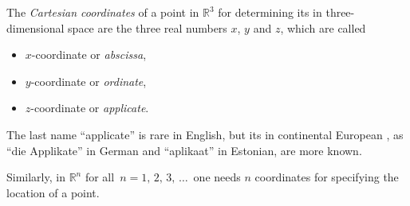 \documentclass[12pt]{article}
\begin{document}
The {\em Cartesian coordinates} of a point in $\mathbb{R}^3$ for determining its  in three-dimensional space are the three real numbers $x$, $y$ and $z$, which are called 
\begin{itemize}
 \item $x$-coordinate or {\em abscissa},
 \item $y$-coordinate or {\em ordinate},
 \item $z$-coordinate or {\em applicate}.
\end{itemize}
The last name ``applicate'' is rare in English, but its  in continental European , as ``die Applikate'' in German and ``aplikaat'' in Estonian, are more known.

Similarly, in $\mathbb{R}^n$ for all\, $n = 1,\,2,\,3,\,\ldots$\, one needs $n$ coordinates for specifying the location of a point.
\end{document}
